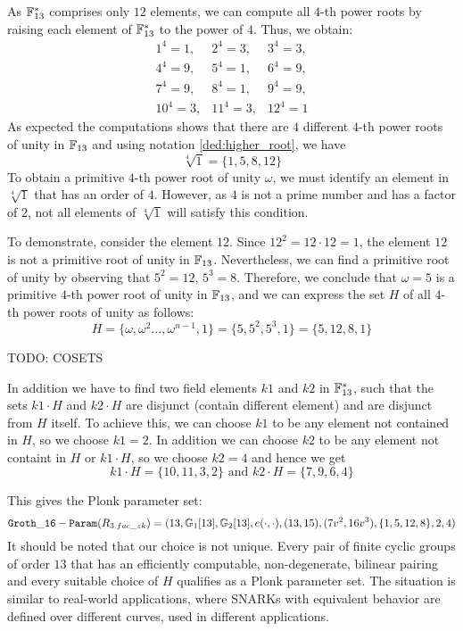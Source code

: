 \begin{example}
As $\mathbb{F}_{13}^*$ comprises only $12$ elements, we can compute all $4$-th power roots by raising each element of $\mathbb{F}_{13}^*$ to the power of $4$. Thus, we obtain:
$$
\begin{array}{lcr}
1^4= 1, &
2^4=3, &
3^4=3, \\
4^4=9, &
5^4=1, &
6^4=9,\\
7^4=9, &
8^4=1, &
9^4=9,\\
10^4=3, &
11^4=3, &
12^4=1
\end{array}
$$
As expected the computations shows that there are $4$ different $4$-th power roots of unity in $\mathbb{F}_{13}$ and using notation \ref{ded:higher_root}, we have
$$
\sqrt[4]{1}= \{1,5,8,12\}
$$
To obtain a primitive $4$-th power root of unity $\omega$, we must identify an element in $\sqrt[4]{1}$ that has an order of $4$. However, as $4$ is not a prime number and has a factor of $2$, not all elements of $\sqrt[4]{1}$ will satisfy this condition.

To demonstrate, consider the element $12$. Since $12^2=12\cdot 12 = 1$, the element $12$ is not a primitive root of unity in $\mathbb{F}_{13}$. Nevertheless, we can find a primitive root of unity by observing that $5^2=12$, $5^3=8$. Therefore, we conclude that $\omega = 5$ is a primitive $4$-th power root of unity in $\mathbb{F}_{13}$, and we can express the set $H$ of all $4$-th power roots of unity as follows:
$$
H = \{\omega, \omega^2 \ldots, \omega^{n-1}, 1\} = \{5,5^2,5^3,1\} = \{5,12,8,1\}
$$

TODO: COSETS

In addition we have to find two field elements $k1$ and $k2$ in $\mathbb{F}_{13}^*$, such that the sets $k1\cdot H$ and $k2\cdot H$ are disjunct (contain different element) and are disjunct from $H$ itself. To achieve this, we can choose $k1$ to be any element not contained in $H$, so we choose $k1=2$. In addition we can choose $k2$ to be any element not containt in $H$ or $k1\cdot H$, so we choose $k2=4$ and hence we get
$$
k1\cdot H = \{10, 11, 3, 2\} \text{ and } k2\cdot H = \{7, 9, 6, 4\} 
$$ 

This gives the Plonk parameter set:
$$
\mathtt{Groth\_16-Param}(R_{3.fac\_zk})=(13, \mathbb{G}_1[13], \mathbb{G}_2[13], e(\cdot,\cdot), (13,15),(7v^2,16v^3), \{1,5, 12, 8\}, 2, 4)
$$
It should be noted that our choice is not unique. Every pair of finite cyclic groups of order $13$ that has an efficiently computable, non-degenerate, bilinear pairing and every suitable choice of $H$ qualifies as a Plonk parameter set. The situation is similar to real-world applications, where SNARKs with equivalent behavior are defined over different curves, used in different applications.


\end{example}
